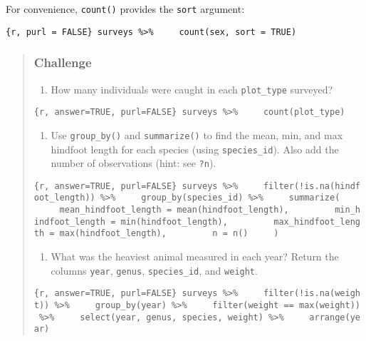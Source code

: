 \documentclass[]{article}
\providecommand{\tightlist}{%
  \setlength{\itemsep}{0pt}\setlength{\parskip}{0pt}}
\begin{document}
For convenience, \texttt{count()} provides the \texttt{sort} argument:

\texttt{\{r,\ purl\ =\ FALSE\}\ surveys\ \%\textgreater{}\%\ \ \ \ \ count(sex,\ sort\ =\ TRUE)}

\begin{quote}
\subsubsection{Challenge}\label{challenge-2}

\begin{enumerate}
\def\labelenumi{\arabic{enumi}.}
\tightlist
\item
  How many individuals were caught in each \texttt{plot\_type} surveyed?
\end{enumerate}

\texttt{\{r,\ answer=TRUE,\ purl=FALSE\}\ surveys\ \%\textgreater{}\%\ \ \ \ \ count(plot\_type)}

\begin{enumerate}
\def\labelenumi{\arabic{enumi}.}
\setcounter{enumi}{1}
\tightlist
\item
  Use \texttt{group\_by()} and \texttt{summarize()} to find the mean,
  min, and max hindfoot length for each species (using
  \texttt{species\_id}). Also add the number of observations (hint: see
  \texttt{?n}).
\end{enumerate}

\texttt{\{r,\ answer=TRUE,\ purl=FALSE\}\ surveys\ \%\textgreater{}\%\ \ \ \ \ filter(!is.na(hindfoot\_length))\ \%\textgreater{}\%\ \ \ \ \ group\_by(species\_id)\ \%\textgreater{}\%\ \ \ \ \ summarize(\ \ \ \ \ \ \ \ \ mean\_hindfoot\_length\ =\ mean(hindfoot\_length),\ \ \ \ \ \ \ \ \ min\_hindfoot\_length\ =\ min(hindfoot\_length),\ \ \ \ \ \ \ \ \ max\_hindfoot\_length\ =\ max(hindfoot\_length),\ \ \ \ \ \ \ \ \ n\ =\ n()\ \ \ \ \ )}

\begin{enumerate}
\def\labelenumi{\arabic{enumi}.}
\setcounter{enumi}{2}
\tightlist
\item
  What was the heaviest animal measured in each year? Return the columns
  \texttt{year}, \texttt{genus}, \texttt{species\_id}, and
  \texttt{weight}.
\end{enumerate}

\texttt{\{r,\ answer=TRUE,\ purl=FALSE\}\ surveys\ \%\textgreater{}\%\ \ \ \ \ filter(!is.na(weight))\ \%\textgreater{}\%\ \ \ \ \ group\_by(year)\ \%\textgreater{}\%\ \ \ \ \ filter(weight\ ==\ max(weight))\ \%\textgreater{}\%\ \ \ \ \ select(year,\ genus,\ species,\ weight)\ \%\textgreater{}\%\ \ \ \ \ arrange(year)}
\end{quote}
\end{document}
